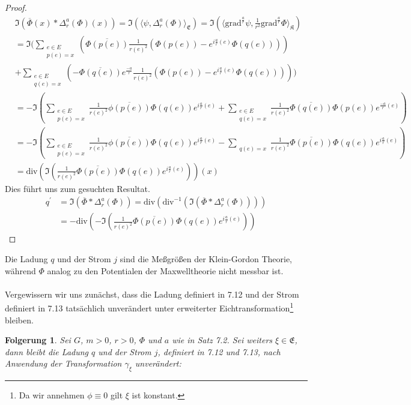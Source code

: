 \documentclass[11pt,a4paper,leqno]{report}
\newtheorem{corollary}[theorem]{Folgerung}
\numberwithin{equation}{chapter}
\begin{document}
\begin{proof}
\begin{align*}
	&\Im(\overline{\Phi}(x)*\Delta^a_r(\Phi)(x)) = \Im(\langle \psi, \Delta^a_r(\Phi)\rangle_{\mathfrak{E}})=
	\Im(\langle \text{grad}^{\frac{a}{r}}\psi, \frac{1}{r^2}\text{grad}^{\frac{a}{r}}\Phi\rangle_{\mathfrak{K}})\\
	&=\Im(\sum_{\substack{e\in E\\p(e)=x}} (\overline{\Phi(p(e))} \frac{1}{r(e)^2}(\Phi(p(e))-e^{i\frac{a}{r}(e)}\Phi(q(e)))) \\ &+ 
	\sum_{\substack{e\in E\\q(e)=x}} (-\overline{\Phi(q(e))}e^{\frac{-a}{r}} \frac{1}{r(e)^2}(\Phi(p(e))-e^{i\frac{a}{r}(e)}\Phi(q(e)))))\\
	&=-\Im(\sum_{\substack{e\in E\\p(e)=x}}\frac{1}{r(e)^2} \overline{\phi(p(e))}\Phi(q(e)) e^{i\frac{a}{r}(e)}  +
	\sum_{\substack{e\in E\\q(e)=x}}\frac{1}{r(e)^2} \overline{\Phi(q(e))}\Phi(p(e))e^{\frac{-a}{r}(e)} )\\
	&=-\Im(\sum_{\substack{e\in E\\p(e)=x}}\frac{1}{r(e)^2} \overline{\phi(p(e))}\Phi(q(e)) e^{i\frac{a}{r}(e)}  -
	\sum_{\substack{ \\q(e)=x}}\frac{1}{r(e)^2} \overline{\Phi(p(e))}\Phi(q(e))e^{i\frac{a}{r}(e)} )\\
	&=\text{div}(\Im(\frac{1}{r(e)^2} \overline{\Phi(p(e))}\Phi(q(e))e^{i\frac{a}{r}(e)}))(x)
\end{align*}
Dies f\"uhrt uns zum gesuchten Resultat.
\begin{align*}
	q^\prime &=\Im(\overline{\Phi}*\Delta^a_r(\Phi))=\text{div}(\text{div}^{-1}(\Im(\overline{\Phi}*\Delta^a_r(\Phi))))\\
	&=
	-\text{div}(-\Im(\frac{1}{r(e)^2} \overline{\Phi(p(e))}\Phi(q(e))e^{i\frac{a}{r}(e)}))
\end{align*}
\end{proof}
\noindent
Die Ladung $q$ und der Strom $j$ sind die Me\ss{}gr\"o\ss{}en der Klein-Gordon Theorie, w\"ahrend $\Phi$ analog zu den Potentialen der Maxwelltheorie nicht messbar ist.\\
\\
Vergewissern wir uns zun\"achst, dass die Ladung definiert in 7.12 und der Strom definiert in 7.13 tats\"achlich unver\"andert unter erweiterter Eichtransformation\footnote{Da wir annehmen $\phi\equiv 0$ gilt $\xi$ ist konstant.} bleiben.
\begin{corollary}
	Sei $G$, $m>0$, $r>0$, $\Phi$ und $a$ wie in Satz 7.2. Sei weiters $\xi\in \mathfrak{E}$, dann bleibt die Ladung $q$ und der Strom $j$, definiert in 7.12 und 7.13, nach Anwendung der Transformation $\gamma_\xi$ unver\"andert:
\end{corollary}
\end{document}
